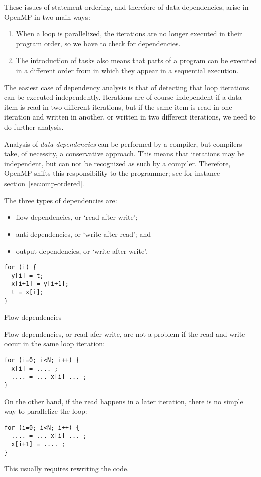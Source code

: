 These issues of statement ordering, and therefore of
data dependencies, arise in OpenMP in two main ways:
\begin{enumerate}
\item When a loop is parallelized, the iterations are no longer
  executed in their program order, so we have to check for dependencies.
\item The introduction of tasks also means that parts of a program
  can be executed in a different order from in which they appear
  in a sequential execution.
\end{enumerate}

The easiest case of dependency analysis is that of
detecting that loop iterations can be executed independently.
Iterations are of course independent if a data item
is read in two different iterations, but if the same
item is read in one iteration and written in another,
or written in two different iterations,
we need to do further analysis.

Analysis of \emph{data dependencies} can be performed
by a compiler, but compilers take, of necessity,
a conservative approach. This means that iterations
may be independent, but can not be recognized as such by
a compiler. Therefore, OpenMP shifts this responsibility
to the programmer; see for instance section~\ref{sec:omp-ordered}.

The three types of dependencies are:
\begin{itemize}
\item flow dependencies, or `read-after-write';
\item anti dependencies, or `write-after-read'; and
\item output dependencies, or `write-after-write'.
\end{itemize}

\begin{verbatim}
for (i) {
  y[i] = t;
  x[i+1] = y[i+1];
  t = x[i];
}
\end{verbatim}

 {Flow dependencies}

Flow dependencies, or read-afer-write,
are not a problem if the read and write occur in the same
loop iteration:
\begin{verbatim}
for (i=0; i<N; i++) {
  x[i] = .... ;
  .... = ... x[i] ... ;
}
\end{verbatim}
On the other hand, if the read happens in a later iteration,
there is no simple way to parallelize the loop:
\begin{verbatim}
for (i=0; i<N; i++) {
  .... = ... x[i] ... ;
  x[i+1] = .... ;
}
\end{verbatim}
This usually requires rewriting the code.

